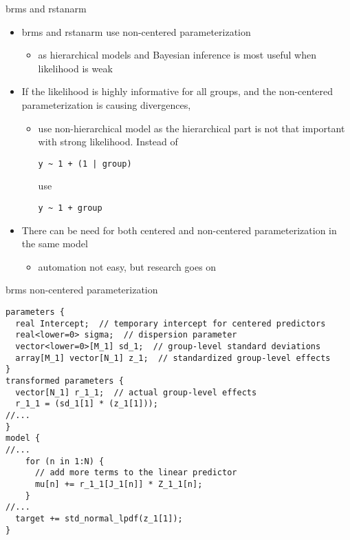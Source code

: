 \documentclass[finnish,english,t]{beamer}
\begin{document}
\begin{frame}[fragile]{brms and rstanarm}

  \begin{itemize}
  \item<+-> brms and rstanarm use non-centered parameterization
    \begin{itemize}
    \item as hierarchical models and Bayesian inference is most useful
      when likelihood is weak
    \end{itemize}
  \item<+-> If the likelihood is highly informative for all groups, and
    the non-centered parameterization is causing divergences,
    \begin{itemize}
    \item use non-hierarchical model as the hierarchical part is not
      that important with strong likelihood. Instead of 
\begin{verbatim}
y ~ 1 + (1 | group)
\end{verbatim}
      use
\begin{verbatim}
y ~ 1 + group
\end{verbatim}
    \end{itemize}
  \item<+-> There can be need for both centered and non-centered
    parameterization in the same model
    \begin{itemize}
    \item automation not easy, but research goes on
    \end{itemize}
  \end{itemize}
\end{frame}

\begin{frame}[fragile]{brms non-centered parameterization}

  \vspace{-\baselineskip}
\begin{verbatim}
parameters {
  real Intercept;  // temporary intercept for centered predictors
  real<lower=0> sigma;  // dispersion parameter
  vector<lower=0>[M_1] sd_1;  // group-level standard deviations
  array[M_1] vector[N_1] z_1;  // standardized group-level effects
}
transformed parameters {
  vector[N_1] r_1_1;  // actual group-level effects
  r_1_1 = (sd_1[1] * (z_1[1]));
//...
}
model {
//...
    for (n in 1:N) {
      // add more terms to the linear predictor
      mu[n] += r_1_1[J_1[n]] * Z_1_1[n];
    }
//...
  target += std_normal_lpdf(z_1[1]);
}
\end{verbatim}

\end{frame}
\end{document}

